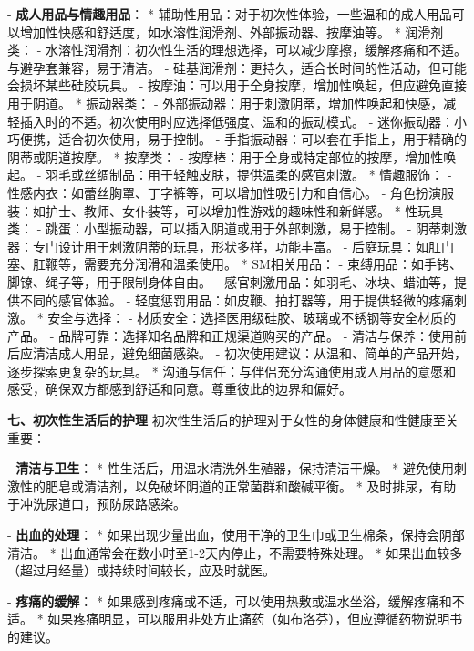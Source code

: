\begin{enumerate}
  - \textbf{成人用品与情趣用品}：
    * 辅助性用品：对于初次性体验，一些温和的成人用品可以增加性快感和舒适度，如水溶性润滑剂、外部振动器、按摩油等。
    * 润滑剂类：
      - 水溶性润滑剂：初次性生活的理想选择，可以减少摩擦，缓解疼痛和不适。与避孕套兼容，易于清洁。
      - 硅基润滑剂：更持久，适合长时间的性活动，但可能会损坏某些硅胶玩具。
      - 按摩油：可以用于全身按摩，增加性唤起，但应避免直接用于阴道。
    * 振动器类：
      - 外部振动器：用于刺激阴蒂，增加性唤起和快感，减轻插入时的不适。初次使用时应选择低强度、温和的振动模式。
      - 迷你振动器：小巧便携，适合初次使用，易于控制。
      - 手指振动器：可以套在手指上，用于精确的阴蒂或阴道按摩。
    * 按摩类：
      - 按摩棒：用于全身或特定部位的按摩，增加性唤起。
      - 羽毛或丝绸制品：用于轻触皮肤，提供温柔的感官刺激。
    * 情趣服饰：
      - 性感内衣：如蕾丝胸罩、丁字裤等，可以增加性吸引力和自信心。
      - 角色扮演服装：如护士、教师、女仆装等，可以增加性游戏的趣味性和新鲜感。
    * 性玩具类：
      - 跳蛋：小型振动器，可以插入阴道或用于外部刺激，易于控制。
      - 阴蒂刺激器：专门设计用于刺激阴蒂的玩具，形状多样，功能丰富。
      - 后庭玩具：如肛门塞、肛鞭等，需要充分润滑和温柔使用。
    * SM相关用品：
      - 束缚用品：如手铐、脚镣、绳子等，用于限制身体自由。
      - 感官刺激用品：如羽毛、冰块、蜡油等，提供不同的感官体验。
      - 轻度惩罚用品：如皮鞭、拍打器等，用于提供轻微的疼痛刺激。
    * 安全与选择：
      - 材质安全：选择医用级硅胶、玻璃或不锈钢等安全材质的产品。
      - 品牌可靠：选择知名品牌和正规渠道购买的产品。
      - 清洁与保养：使用前后应清洁成人用品，避免细菌感染。
      - 初次使用建议：从温和、简单的产品开始，逐步探索更复杂的玩具。
    * 沟通与信任：与伴侣充分沟通使用成人用品的意愿和感受，确保双方都感到舒适和同意。尊重彼此的边界和偏好。

  \textbf{七、初次性生活后的护理}
  初次性生活后的护理对于女性的身体健康和性健康至关重要：

  - \textbf{清洁与卫生}：
    * 性生活后，用温水清洗外生殖器，保持清洁干燥。
    * 避免使用刺激性的肥皂或清洁剂，以免破坏阴道的正常菌群和酸碱平衡。
    * 及时排尿，有助于冲洗尿道口，预防尿路感染。

  - \textbf{出血的处理}：
    * 如果出现少量出血，使用干净的卫生巾或卫生棉条，保持会阴部清洁。
    * 出血通常会在数小时至1-2天内停止，不需要特殊处理。
    * 如果出血较多（超过月经量）或持续时间较长，应及时就医。

  - \textbf{疼痛的缓解}：
    * 如果感到疼痛或不适，可以使用热敷或温水坐浴，缓解疼痛和不适。
    * 如果疼痛明显，可以服用非处方止痛药（如布洛芬），但应遵循药物说明书的建议。


\end{enumerate}
